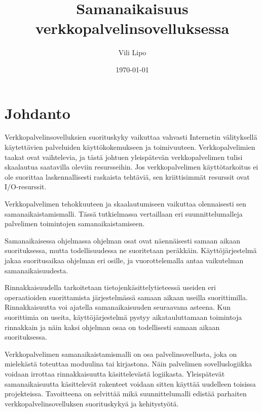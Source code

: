 \documentclass[finnish]{tktltiki2}
\title{Samanaikaisuus verkkopalvelinsovelluksessa}
\author{Vili Lipo}
\date{\today}
\theoremstyle{definition}
\theoremstyle{remark}
\begin{document}
\frontmatter      %

\maketitle        %
\makeabstract     %

\tableofcontents  %


\mainmatter       %

\section{Johdanto}
Verkkopalvelinsovelluksien suorituskyky vaikuttaa vahvasti
Internetin välityksellä käytettävien palveluiden käyttökokemukseen ja toimivuuteen.
Verkkopalvelimien taakat ovat vaihtelevia, ja tästä johtuen
yleispätevän verkkopalvelimen tulisi skaalautua saatavilla oleviin resursseihin.
Jos verkkopalvelimen käyttötarkoitus ei ole suorittaa laskennallisesti raskaista
tehtäviä, sen
kriittisimmät resurssit ovat I/O-resurssit.

Verkkopalvelimen tehokkuuteen ja skaalautumiseen vaikuttaa olennaisesti
sen samanaikaistamismalli. Tässä
tutkielmassa vertaillaan eri suunnittelumalleja palvelimen toimintojen samanaikaistamiseen.

Samanaikaisessa ohjelmassa ohjelman osat ovat näennäisesti samaan
aikaan suorituksessa, mutta todellisuudessa ne suoritetaan peräkkäin.
Käyttöjärjestelmä jakaa suoritusaikaa ohjelman eri osille,
ja vuorottelemalla antaa vaikutelman samanaikaisuudesta.

Rinnakkaisuudella tarkoitetaan tietojenkäsittelytieteessä useiden
eri operaatioiden suorittamista järjestelmässä samaan aikaan useilla suorittimilla.
Rinnakkaisuutta voi
ajatella samanaikaisuuden seuraavana asteena. Kun suorittimia
on useita, käyttöjärjestelmä pystyy aikatauluttamaan toimintoja
rinnakkain ja näin kaksi ohjelman osaa on todellisesti
samaan aikaan suorituksessa.

Verkkopalvelimen samanaikaistamismalli on osa palvelinsovellusta,
joka on mielekästä toteuttaa moduulina tai kirjastona.
Näin palvelimen sovelluslogiikka voidaan irrottaa rinnakkaisuutta
käsittelevästä logiikasta. Yleispätevät
samanaikaisuutta käsittelevät rakenteet voidaan sitten
käyttää uudelleen toisissa projekteissa.
Tavoitteena on selvittää mikä suunnittelumalli edistää
parhaiten verkkopalvelinsovelluksen suorituskykyä ja
kehitystyötä.
\end{document}
